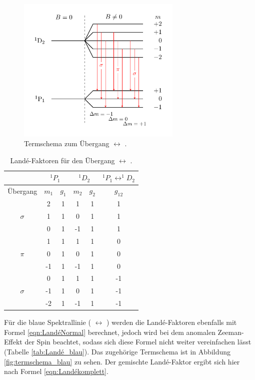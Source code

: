 \begin{figure}[h]
  \centering
  \includegraphics[width=0.7\textwidth]{Pics/termschema_rot.pdf}
  \caption{Termschema zum Übergang  $\leftrightarrow$ 
          \cite{luckyjosh}.}
  \label{fig:TermschemaRot}
\end{figure}

\begin{table}[h]
	\centering
  \caption{Landé-Faktoren für den Übergang  $\leftrightarrow$ .}
	\label{tab:LandéRot}
	\begin{tabular}{cccccc}
		\toprule
		{} & \multicolumn{2}{c}{${}^1P_1$}  & \multicolumn{2}{c}{${}^1D_2$}  & $^1P_1\leftrightarrow ^1\!\!D_2$ \\
		\midrule
		 Übergang &   $m_1$  & $g_{1}$ & $m_2$ & $ g_2$  & $g_{12}$  \\
		\midrule
		& 2 & 1 & 1 & 1 & 1\\
		$\sigma$& 1 & 1 & 0 & 1 & 1\\
		& 0 & 1 & -1 & 1 & 1\\
		\midrule
		& 1 & 1 & 1 & 1 & 0\\
		$\pi$ & 0 & 1 & 0 & 1 & 0\\
		& -1 & 1 & -1 & 1 & 0\\
		\midrule
		& 0 & 1 & 1 & 1 & -1\\
		$\sigma$ & -1 & 1 & 0 & 1 & -1\\
		& -2 & 1 & -1 & 1 & -1\\\bottomrule
	\end{tabular}
\end{table}

Für die blaue Spektrallinie ( $\leftrightarrow$ ) werden die
Landé-Faktoren ebenfalls mit Formel \eqref{eqn:LandéNormal} berechnet, jedoch wird
bei dem anomalen Zeeman-Effekt der Spin beachtet, sodass sich diese Formel nicht
weiter vereinfachen lässt (Tabelle \ref{tab:Landé_blau}). Das zugehörige Termschema
ist in Abbildung \ref{fig:termschema_blau} zu sehen. Der gemischte Landé-Faktor
ergibt sich hier nach Formel \eqref{eqn:Landékomplett}.

